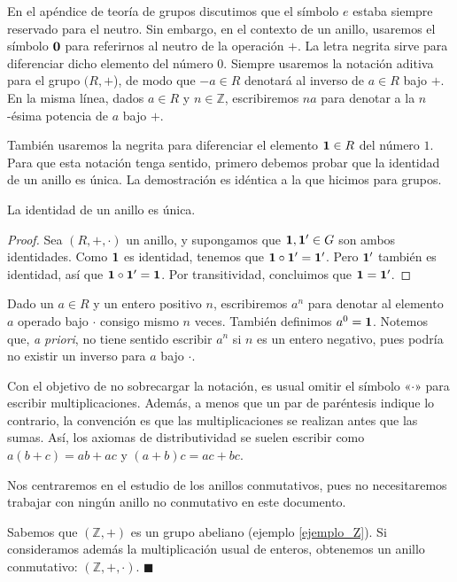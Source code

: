 En el apéndice de teoría de grupos discutimos que el símbolo $e$ estaba siempre reservado para el neutro. Sin embargo, en el contexto de un anillo, usaremos el símbolo $\mathbf{0}$ para referirnos al neutro de la operación $+$. La letra negrita sirve para diferenciar dicho elemento del número $0$. Siempre usaremos la notación aditiva para el grupo $(R, +$), de modo que $-a \in R$ denotará al inverso de $a \in R$ bajo $+$. En la misma línea, dados $a \in R$ y $n \in \mathbb{Z}$, escribiremos $na$ para denotar a la $n$-ésima potencia de $a$ bajo $+$.

También usaremos la negrita para diferenciar el elemento $\mathbf{1} \in R$ del número $1$. Para que esta notación tenga sentido, primero debemos probar que la identidad de un anillo es única. La demostración es idéntica a la que hicimos para grupos.

\begin{proposition}
    La identidad de un anillo es única.
\end{proposition}
    
    \begin{proof}
    Sea $(R, +, \cdot)$ un anillo, y supongamos que $\mathbf{1}, \mathbf{1}' \in G$ son ambos identidades. Como $\mathbf{1}$ es identidad, tenemos que $\mathbf{1} \circ \mathbf{1}' = \mathbf{1}'$. Pero $\mathbf{1}'$ también es identidad, así que $\mathbf{1} \circ \mathbf{1}' = \mathbf{1}$. Por transitividad, concluimos que $\mathbf{1} = \mathbf{1}'$.
    \end{proof}

Dado un $a \in R$ y un entero positivo $n$, escribiremos $a^n$ para denotar al elemento $a$ operado bajo $\cdot$ consigo mismo $n$ veces. También definimos $a^0 = \mathbf{1}$. Notemos que, \textit{a priori}, no tiene sentido escribir $a^n$ si $n$ es un entero negativo, pues podría no existir un inverso para $a$ bajo $\cdot$.

Con el objetivo de no sobrecargar la notación, es usual omitir el símbolo «$\cdot$» para escribir multiplicaciones. Además, a menos que un par de paréntesis indique lo contrario, la convención es que las multiplicaciones se realizan antes que las sumas. Así, los axiomas de distributividad se suelen escribir como $a(b+c) = ab+ac$ y $(a+b)c = ac + bc$. 

Nos centraremos en el estudio de los anillos conmutativos, pues no necesitaremos trabajar con ningún anillo no conmutativo en este documento.

\begin{example} 
Sabemos que $(\mathbb{Z}, +)$ es un grupo abeliano (ejemplo \ref{ejemplo_Z}). Si consideramos además la multiplicación usual de enteros, obtenemos un anillo conmutativo: $(\mathbb{Z}, +, \cdot)$. \hfill$\blacksquare$
\end{example}

